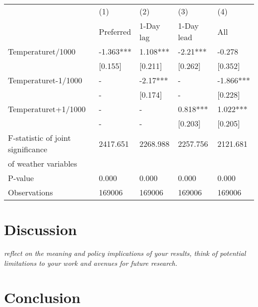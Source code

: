 \documentclass[11pt]{article}
\begin{document}
	
	\begin{center}
	 \label{tab:title} 
	\begin{tabular}{lllll}
		\toprule
		{} &        (1) &       (2) &       (3) &        (4) \\
		&  Preferred &    1-Day lag &   1-Day lead &          All \\
		\midrule
		Temperaturet/1000                 &  -1.363*** &  1.108*** &  -2.21*** &     -0.278 \\
		&    [0.155] &   [0.211] &   [0.262] &    [0.352] \\
		Temperaturet-1/1000               &          - &  -2.17*** &         - &  -1.866*** \\
		&          - &   [0.174] &         - &    [0.228] \\
		Temperaturet+1/1000               &          - &         - &  0.818*** &   1.022*** \\
		&            - &            - &      [0.203] &      [0.205] \\
		F-statistic of joint significance &   2417.651 &  2268.988 &  2257.756 &   2121.681 \\
		of weather variables              &            &           &           &            \\
		P-value                           &      0.000 &     0.000 &     0.000 &      0.000 \\
		\midrule
		Observations                      &     169006 &    169006 &    169006 &     169006 \\
		\bottomrule
	\end{tabular}
	\end{center}
	
	\section{Discussion}
	\textit{reflect on the meaning and policy implications of your results, think of potential limitations to your work and avenues for future research.}
	\section{ Conclusion}
\end{document}
